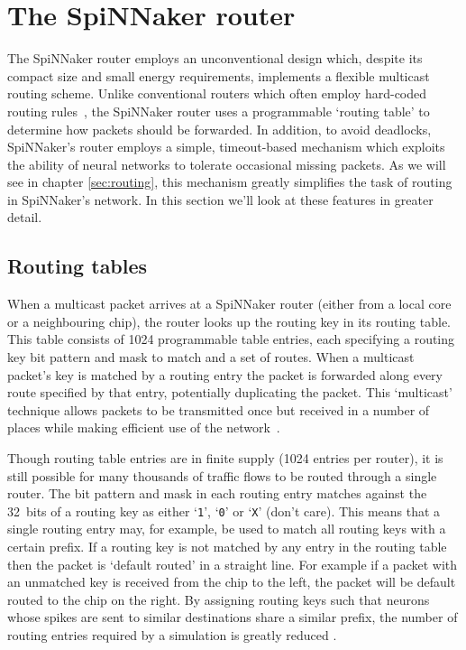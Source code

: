 	\section{The SpiNNaker router}
		
		The SpiNNaker router employs an unconventional design which, despite its
		compact size and small energy requirements, implements a flexible multicast
		routing scheme. Unlike conventional routers which often employ hard-coded
		routing rules~\cite[chapter~8]{dally04}, the SpiNNaker router uses a
		programmable `routing table' to determine how packets should be forwarded.
		In addition, to avoid deadlocks, SpiNNaker's router employs a simple,
		timeout-based mechanism which exploits the ability of neural networks to
		tolerate occasional missing packets. As we will see in chapter
		\ref{sec:routing}, this mechanism greatly simplifies the task of routing in
		SpiNNaker's network. In this section we'll look at these features in
		greater detail.
		
		\subsection{Routing tables}
		
			When a multicast packet arrives at a SpiNNaker router (either from a
			local core or a neighbouring chip), the router looks up the routing key
			in its routing table. This table consists of \num{1024} programmable
			table entries, each specifying a routing key bit pattern and mask to
			match and a set of routes.  When a multicast packet's key is matched by a
			routing entry the packet is forwarded along every route specified by that
			entry, potentially duplicating the packet. This `multicast' technique
			allows packets to be transmitted once but received in a number of places
			while making efficient use of the network~\cite{navaridas12}.
			
			Though routing table entries are in finite supply (\num{1024} entries per
			router), it is still possible for many thousands of traffic flows to be
			routed through a single router. The bit pattern and mask in each routing
			entry matches against the 32~bits of a routing key as either
			`\texttt{1}', `\texttt{0}' or `\texttt{X}' (don't care).  This means that
			a single routing entry may, for example, be used to match all routing
			keys with a certain prefix. If a routing key is not matched by any entry
			in the routing table then the packet is `default routed' in a straight
			line. For example if a packet with an unmatched key is received from the
			chip to the left, the packet will be default routed to the chip on the
			right. By assigning routing keys such that neurons whose spikes are sent
			to similar destinations share a similar prefix, the number of routing
			entries required by a simulation is greatly reduced \cite{davies12}.
			
